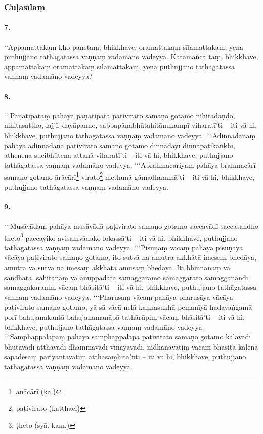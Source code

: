 \subsubsection{Cūḷasīlaṃ}

\paragraph{7.}
‘‘Appamattakaṃ kho panetaṃ, bhikkhave, oramattakaṃ sīlamattakaṃ, yena puthujjano tathāgatassa vaṇṇaṃ vadamāno vadeyya. Katamañca taṃ, bhikkhave, appamattakaṃ oramattakaṃ sīlamattakaṃ, yena puthujjano tathāgatassa vaṇṇaṃ vadamāno vadeyya?

\paragraph{8.}
‘‘‘Pāṇātipātaṃ pahāya pāṇātipātā paṭivirato samaṇo gotamo nihitadaṇḍo, nihitasattho, lajjī, dayāpanno, sabbapāṇabhūtahitānukampī viharatī’ti – iti vā hi, bhikkhave, puthujjano tathāgatassa vaṇṇaṃ vadamāno vadeyya. ‘‘‘Adinnādānaṃ pahāya adinnādānā paṭivirato samaṇo gotamo dinnādāyī dinnapāṭikaṅkhī, athenena sucibhūtena attanā viharatī’ti – iti vā hi, bhikkhave, puthujjano tathāgatassa vaṇṇaṃ vadamāno vadeyya. ‘‘‘Abrahmacariyaṃ pahāya brahmacārī samaṇo gotamo ārācārī\footnote{anācārī (ka.)} virato\footnote{paṭivirato (katthaci)} methunā gāmadhammā’ti – iti vā hi, bhikkhave, puthujjano tathāgatassa vaṇṇaṃ vadamāno vadeyya.

\paragraph{9.}
‘‘‘Musāvādaṃ pahāya musāvādā paṭivirato samaṇo gotamo saccavādī saccasandho theto\footnote{ṭheto (syā. kaṃ.)} paccayiko avisaṃvādako lokassā’ti – iti vā hi, bhikkhave, puthujjano tathāgatassa vaṇṇaṃ vadamāno vadeyya. ‘‘‘Pisuṇaṃ vācaṃ pahāya pisuṇāya vācāya paṭivirato samaṇo gotamo, ito sutvā na amutra akkhātā imesaṃ bhedāya, amutra vā sutvā na imesaṃ akkhātā amūsaṃ bhedāya. Iti bhinnānaṃ vā sandhātā, sahitānaṃ vā anuppadātā samaggārāmo samaggarato samagganandī samaggakaraṇiṃ vācaṃ bhāsitā’ti – iti vā hi, bhikkhave, puthujjano tathāgatassa vaṇṇaṃ vadamāno vadeyya. ‘‘‘Pharusaṃ vācaṃ pahāya pharusāya vācāya paṭivirato samaṇo gotamo, yā sā vācā nelā kaṇṇasukhā pemanīyā hadayaṅgamā porī bahujanakantā bahujanamanāpā tathārūpiṃ vācaṃ bhāsitā’ti – iti vā hi, bhikkhave, puthujjano tathāgatassa vaṇṇaṃ vadamāno vadeyya. ‘‘‘Samphappalāpaṃ pahāya samphappalāpā paṭivirato samaṇo gotamo kālavādī bhūtavādī atthavādī dhammavādī vinayavādī, nidhānavatiṃ vācaṃ bhāsitā kālena sāpadesaṃ pariyantavatiṃ atthasaṃhita’nti – iti vā hi, bhikkhave, puthujjano tathāgatassa vaṇṇaṃ vadamāno vadeyya.

